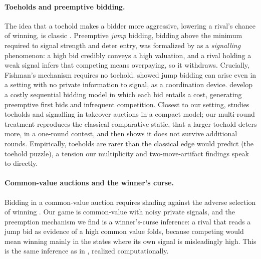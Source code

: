 \documentclass[11pt,a4paper]{article}
\begin{document}
\paragraph{Toeholds and preemptive bidding.} The idea that a toehold makes a bidder more aggressive, lowering a rival's chance of winning, is classic \citep{bulow1999,klemperer1999}. Preemptive \emph{jump} bidding, bidding above the minimum required to signal strength and deter entry, was formalized by \citet{fishman1988} as a \emph{signalling} phenomenon: a high bid credibly conveys a high valuation, and a rival holding a weak signal infers that competing means overpaying, so it withdraws. Crucially, Fishman's mechanism requires no toehold. \citet{avery1998} showed jump bidding can arise even in a setting with no private information to signal, as a coordination device. \citet{danielhirshleifer2018} develop a costly sequential bidding model in which each bid entails a cost, generating preemptive first bids and infrequent competition. Closest to our setting, \citet{dodonova2012} studies toeholds and signalling in takeover auctions in a compact model; our multi-round treatment reproduces the classical comparative static, that a larger toehold deters more, in a one-round contest, and then shows it does not survive additional rounds. Empirically, toeholds are rarer than the classical edge would predict (the toehold puzzle), a tension our multiplicity and two-move-artifact findings speak to directly.

\paragraph{Common-value auctions and the winner's curse.} Bidding in a common-value auction requires shading against the adverse selection of winning \citep{capen1971,milgromweber1982,wilson1977}. Our game is common-value with noisy private signals, and the preemption mechanism we find is a winner's-curse inference: a rival that reads a jump bid as evidence of a high common value folds, because competing would mean winning mainly in the states where its own signal is misleadingly high. This is the same inference as in \citet{fishman1988}, realized computationally.
\end{document}
